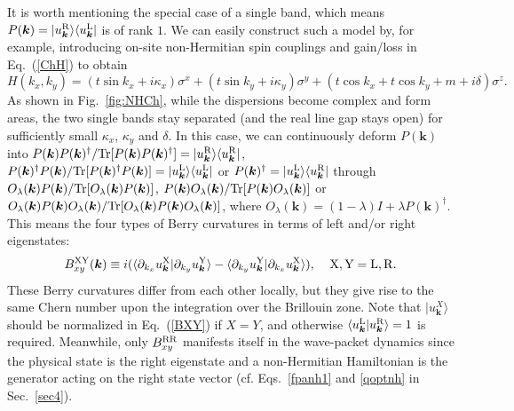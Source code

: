 \documentclass{tADP2e}
\theoremstyle{plain}
\theoremstyle{plain}
\theoremstyle{definition}
\begin{document}
It is worth mentioning the special case of a single band, which means $P(\boldsymbol{k})=| u^{\rm R}_{\boldsymbol{k}}\rangle\langle u^{\rm L}_{\boldsymbol{k}}|$ is of rank $1$. We can easily construct such a model by, for example, introducing on-site non-Hermitian spin couplings and gain/loss in Eq.~(\ref{ChH}) to obtain \cite{SH18}
\begin{equation}
H(k_x,k_y)=(t\sin k_x+i\kappa_x)\sigma^x+(t\sin k_y+i\kappa_y)\sigma^y+(t\cos k_x+t\cos k_y+m+i\delta)\sigma^z.
\label{NHCh}
\end{equation}
As shown in Fig.~\ref{fig:NHCh}, while the dispersions become complex and form areas, the two single bands stay separated (and the real line gap stays open) for sufficiently small $\kappa_x$, $\kappa_y$ and $\delta$. In this case, we can continuously deform $P(\boldsymbol{k})$ into $P(\boldsymbol{k})P(\boldsymbol{k})^\dag /{\rm Tr}[P(\boldsymbol{k})P(\boldsymbol{k})^\dag]=| u^{\rm R}_{\boldsymbol{k}}\rangle\langle u^{\rm R}_{\boldsymbol{k}}|$, $P(\boldsymbol{k})^\dag P(\boldsymbol{k})/{\rm Tr}[P(\boldsymbol{k})^\dag P(\boldsymbol{k})]=| u^{\rm L}_{\boldsymbol{k}}\rangle\langle u^{\rm L}_{\boldsymbol{k}}|$ or $P(\boldsymbol{k})^\dag=| u^{\rm L}_{\boldsymbol{k}}\rangle\langle u^{\rm R}_{\boldsymbol{k}}|$ through $O_\lambda (\boldsymbol{k})P(\boldsymbol{k})/{\rm Tr}[O_\lambda (\boldsymbol{k})P(\boldsymbol{k})]$, $P(\boldsymbol{k})O_\lambda (\boldsymbol{k})/{\rm Tr}[P(\boldsymbol{k})O_\lambda (\boldsymbol{k})]$ or $O_\lambda (\boldsymbol{k})P(\boldsymbol{k})O_\lambda (\boldsymbol{k})/{\rm Tr}[O_\lambda (\boldsymbol{k})P(\boldsymbol{k})O_\lambda (\boldsymbol{k})]$, where $O_\lambda (\boldsymbol{k})=(1-\lambda)I+\lambda P(\boldsymbol{k})^\dag$. This means the four types of Berry curvatures in terms of left and/or right eigenstates:
\begin{equation}
B^{\rm XY}_{xy}(\boldsymbol{k})\equiv i(\langle\partial_{k_x}u^{\rm X}_{\boldsymbol{k}}|\partial_{k_y}u^{\rm Y}_{\boldsymbol{k}}\rangle-\langle\partial_{k_y}u^{\rm Y}_{\boldsymbol{k}}|\partial_{k_x}u^{\rm X}_{\boldsymbol{k}}\rangle),\;\;\;\;{\rm X,Y=L,R}.
\label{BXY}
\end{equation} 
These Berry curvatures differ from each other locally, but they give rise to the same Chern number upon the integration over the %
Brillouin zone. Note that $|u^X_{\boldsymbol{k}}\rangle$ should be normalized in Eq.~(\ref{BXY}) if $X=Y$, and otherwise $\langle u^{\rm L}_{\boldsymbol{k}}| u^{\rm R}_{\boldsymbol{k}}\rangle=1$ is required. Meanwhile, %
only $B^{\rm RR}_{xy}$ manifests itself in the wave-packet dynamics since the physical state is the right eigenstate and a non-Hermitian Hamiltonian is the generator acting on the right state vector (cf. Eqs.~\eqref{fpanh1} and \eqref{qoptnh} in Sec.~\ref{sec4}).
\end{document}
